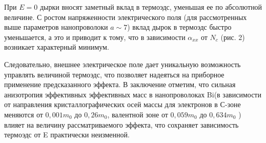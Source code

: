 При $E=0$ дырки вносят заметный вклад в термоэдс, уменьшая ее по абсолютной величине. С ростом напряженности электрического поля (для рассмотренных выше параметров нанопроволоки $a\sim 7$) вклад дырок в термоэдс быстро уменьшается, а это и приводит к тому, что в зависимости $\alpha _{xx} $ от $N_{c} $ (рис. 2) возникает характерный минимум.
 
Следовательно, внешнее электрическое поле дает уникальную возможность управлять величиной термоэдс, что позволяет надеяться  на приборное применение предсказанного эффекта. В заключение отметим, что сильная анизотропия эффективных эффективных масс в нанопроволоках Bi(в зависимости от направления кристаллографических осей массы для электронов в С-зоне меняются от $0,001m_{0} $ до $0,26m_{0} $, валентной зоне от $0,059m_{0} $ до $0,634m_{0} $ \cite{Levin2009a}) влияет на величину рассматриваемого эффекта, что сохраняет зависимость термоэдс от E практически неизменной.
